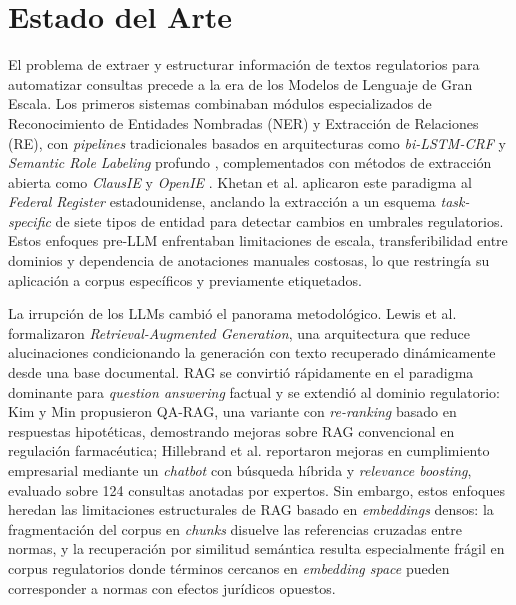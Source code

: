 \documentclass[12pt,a4paper]{article}
\begin{document}
\section{Estado del Arte}
El problema de extraer y estructurar información de textos regulatorios para automatizar consultas precede a la era de los Modelos de Lenguaje de Gran Escala. Los primeros sistemas combinaban módulos especializados de Reconocimiento de Entidades Nombradas (NER) y Extracción de Relaciones (RE), con \textit{pipelines} tradicionales basados en arquitecturas como \textit{bi-LSTM-CRF} \cite{lample2016neural} y \textit{Semantic Role Labeling} profundo \cite{he2017deep}, complementados con métodos de extracción abierta como \textit{ClausIE} \cite{delcorro2013clausie} y \textit{OpenIE} \cite{etzioni2011open}. Khetan et al. \cite{khetan2021kganchored} aplicaron este paradigma al \textit{Federal Register} estadounidense, anclando la extracción a un esquema \textit{task-specific} de siete tipos de entidad para detectar cambios en umbrales regulatorios. Estos enfoques pre-LLM enfrentaban limitaciones de escala, transferibilidad entre dominios y dependencia de anotaciones manuales costosas, lo que restringía su aplicación a corpus específicos y previamente etiquetados.
 
La irrupción de los LLMs cambió el panorama metodológico. Lewis et al. \cite{lewis2020rag} formalizaron \textit{Retrieval-Augmented Generation}, una arquitectura que reduce alucinaciones condicionando la generación con texto recuperado dinámicamente desde una base documental. RAG se convirtió rápidamente en el paradigma dominante para \textit{question answering} factual y se extendió al dominio regulatorio: Kim y Min \cite{kim2024qarag} propusieron QA-RAG, una variante con \textit{re-ranking} basado en respuestas hipotéticas, demostrando mejoras sobre RAG convencional en regulación farmacéutica; Hillebrand et al. \cite{hillebrand2024rag} reportaron mejoras en cumplimiento empresarial mediante un \textit{chatbot} con búsqueda híbrida y \textit{relevance boosting}, evaluado sobre 124 consultas anotadas por expertos. Sin embargo, estos enfoques heredan las limitaciones estructurales de RAG basado en \textit{embeddings} densos: la fragmentación del corpus en \textit{chunks} disuelve las referencias cruzadas entre normas, y la recuperación por similitud semántica resulta especialmente frágil en corpus regulatorios donde términos cercanos en \textit{embedding space} pueden corresponder a normas con efectos jurídicos opuestos.
 
\end{document}
